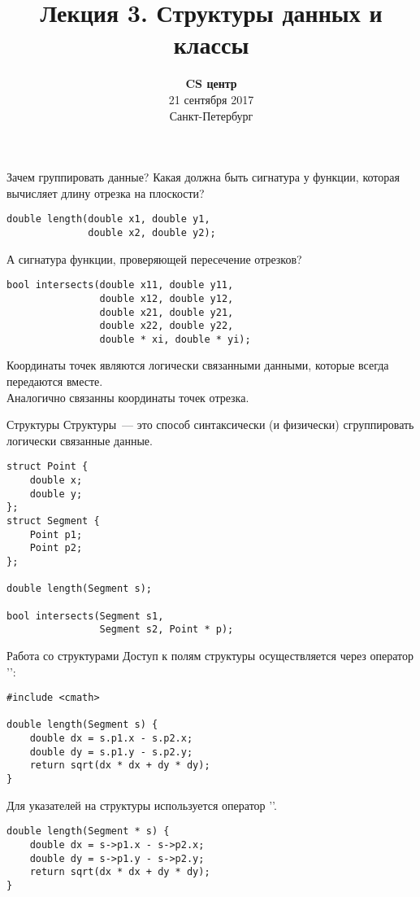 \documentclass{beamer}
\title{Лекция 3. Структуры данных и классы}
\date{
   \textbf{CS центр}\\
   21 сентября 2017 \\
   Санкт-Петербург
}
\begin{document}
\begin{frame} 
  \titlepage
\end{frame}

\begin{frame}[fragile]{Зачем группировать данные?}
    Какая должна быть сигнатура у функции, которая вычисляет длину отрезка на
    плоскости?
    \begin{lstlisting}
double length(double x1, double y1, 
              double x2, double y2);
    \end{lstlisting}
    А сигнатура функции, проверяющей пересечение отрезков?
    \begin{lstlisting}
bool intersects(double x11, double y11, 
                double x12, double y12,
                double x21, double y21, 
                double x22, double y22,
                double * xi, double * yi);
    \end{lstlisting}
Координаты точек являются логически связанными данными, которые всегда передаются
вместе.\\
Аналогично связанны координаты точек отрезка.
\end{frame}

\begin{frame}[fragile]{Структуры}
    Структуры~--- это способ синтаксически (и физически)
    сгруппировать логически связанные данные.
    \begin{lstlisting}
struct Point {
    double x;
    double y;
};
struct Segment {
    Point p1;
    Point p2;
};

double length(Segment s);  

bool intersects(Segment s1, 
                Segment s2, Point * p);
    \end{lstlisting}
\end{frame}

\begin{frame}[fragile]{Работа со структурами}
    Доступ к полям структуры осуществляется через
    оператор '':
    \begin{lstlisting}
#include <cmath>

double length(Segment s) {
    double dx = s.p1.x - s.p2.x;
    double dy = s.p1.y - s.p2.y;
    return sqrt(dx * dx + dy * dy);
}
    \end{lstlisting}
    Для указателей на структуры используется оператор '\code{->}'.
    \begin{lstlisting}
double length(Segment * s) {
    double dx = s->p1.x - s->p2.x;
    double dy = s->p1.y - s->p2.y;
    return sqrt(dx * dx + dy * dy);
}
    \end{lstlisting}
\end{frame}
\end{document}
